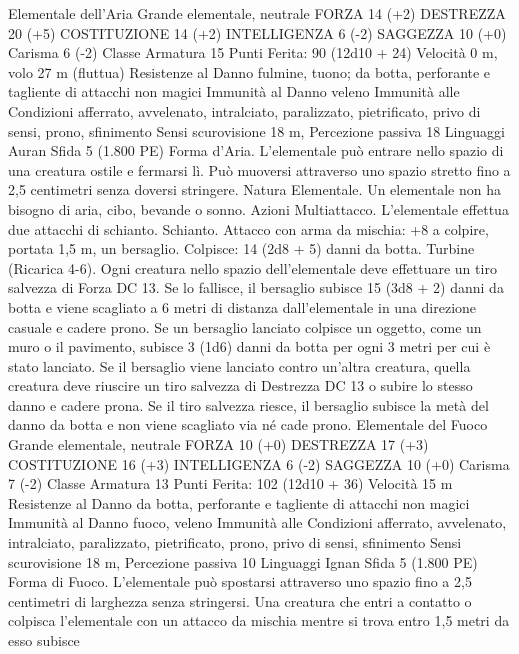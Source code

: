 \begin{multicols}{2}
Elementale dell’Aria
Grande elementale, neutrale
FORZA 14 (+2)
DESTREZZA 20 (+5)
COSTITUZIONE 14 (+2)
INTELLIGENZA 6 (-2)
SAGGEZZA 10 (+0)
Carisma 6 (-2)
Classe Armatura 15
\hspace*{0pt}\hfill{Punti Ferita}: 90 (12d10 + 24)
Velocità 0 m, volo 27 m (fluttua)
Resistenze al Danno fulmine, tuono; da botta, perforante e
tagliente di attacchi non magici
Immunità al Danno veleno
Immunità alle Condizioni afferrato, avvelenato, intralciato,
paralizzato, pietrificato, privo di sensi, prono, sfinimento
Sensi scurovisione 18 m, Percezione passiva 18
Linguaggi Auran
Sfida 5 (1.800 PE)
Forma d’Aria. L’elementale può entrare nello spazio di una
creatura ostile e fermarsi lì. Può muoversi attraverso uno spazio
stretto fino a 2,5 centimetri senza doversi stringere.
Natura Elementale. Un elementale non ha bisogno di aria, cibo,
bevande o sonno.
Azioni
Multiattacco. L’elementale effettua due attacchi di schianto.
Schianto. Attacco con arma da mischia: +8 a colpire, portata 1,5
m, un bersaglio.
Colpisce: 14 (2d8 + 5) danni da botta.
Turbine (Ricarica 4-6). Ogni creatura nello spazio
dell’elementale deve effettuare un tiro salvezza di Forza DC 13.
Se lo fallisce, il bersaglio subisce 15 (3d8 + 2) danni da botta
e viene scagliato a 6 metri di distanza dall’elementale in una
direzione casuale e cadere prono. Se un bersaglio lanciato
colpisce un oggetto, come un muro o il pavimento, subisce 3
(1d6) danni da botta per ogni 3 metri per cui è stato lanciato.
Se il bersaglio viene lanciato contro un’altra creatura, quella
creatura deve riuscire un tiro salvezza di Destrezza DC 13 o
subire lo stesso danno e cadere prona.
Se il tiro salvezza riesce, il bersaglio subisce la metà del danno
da botta e non viene scagliato via né cade prono.
Elementale del Fuoco
Grande elementale, neutrale
FORZA 10 (+0)
DESTREZZA 17 (+3)
COSTITUZIONE 16 (+3)
INTELLIGENZA 6 (-2)
SAGGEZZA 10 (+0)
Carisma 7 (-2)
Classe Armatura 13
\hspace*{0pt}\hfill{Punti Ferita}: 102 (12d10 + 36)
Velocità 15 m
Resistenze al Danno da botta, perforante e tagliente di
attacchi non magici
Immunità al Danno fuoco, veleno
Immunità alle Condizioni afferrato, avvelenato, intralciato,
paralizzato, pietrificato, prono, privo di sensi, sfinimento
Sensi scurovisione 18 m, Percezione passiva 10
Linguaggi Ignan
Sfida 5 (1.800 PE)
Forma di Fuoco. L’elementale può spostarsi attraverso uno
spazio fino a 2,5 centimetri di larghezza senza stringersi. Una
creatura che entri a contatto o colpisca l’elementale con un
attacco da mischia mentre si trova entro 1,5 metri da esso subisce

\end{multicols}
